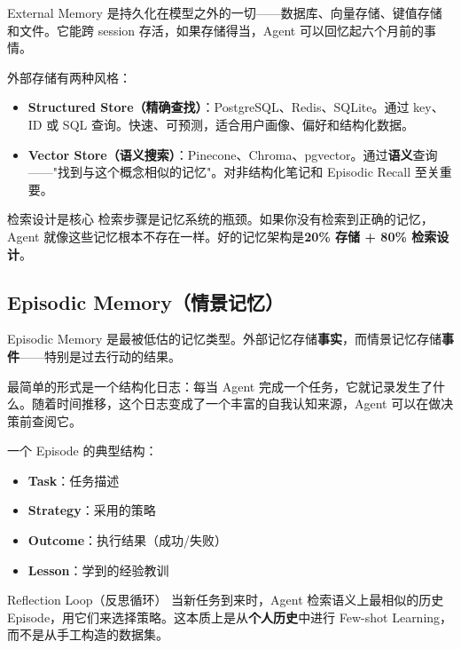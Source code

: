 External Memory 是持久化在模型之外的一切——数据库、向量存储、键值存储和文件。它能跨 session 存活，如果存储得当，Agent 可以回忆起六个月前的事情。

外部存储有两种风格：

\begin{itemize}[leftmargin=2em]
    \item \textbf{Structured Store（精确查找）}：PostgreSQL、Redis、SQLite。通过 key、ID 或 SQL 查询。快速、可预测，适合用户画像、偏好和结构化数据。
    \item \textbf{Vector Store（语义搜索）}：Pinecone、Chroma、pgvector。通过\textbf{语义}查询——"找到与这个概念相似的记忆"。对非结构化笔记和 Episodic Recall 至关重要。
\end{itemize}

\begin{importantbox}{检索设计是核心}
检索步骤是记忆系统的瓶颈。如果你没有检索到正确的记忆，Agent 就像这些记忆根本不存在一样。好的记忆架构是\textbf{20\% 存储 + 80\% 检索设计}。
\end{importantbox}

\subsection{Episodic Memory（情景记忆）}

Episodic Memory 是最被低估的记忆类型。外部记忆存储\textbf{事实}，而情景记忆存储\textbf{事件}——特别是过去行动的结果。

最简单的形式是一个结构化日志：每当 Agent 完成一个任务，它就记录发生了什么。随着时间推移，这个日志变成了一个丰富的自我认知来源，Agent 可以在做决策前查阅它。

一个 Episode 的典型结构：

\begin{itemize}[leftmargin=2em]
    \item \textbf{Task}：任务描述
    \item \textbf{Strategy}：采用的策略
    \item \textbf{Outcome}：执行结果（成功/失败）
    \item \textbf{Lesson}：学到的经验教训
\end{itemize}

\begin{knowledgebox}{Reflection Loop（反思循环）}
当新任务到来时，Agent 检索语义上最相似的历史 Episode，用它们来选择策略。这本质上是从\textbf{个人历史}中进行 Few-shot Learning，而不是从手工构造的数据集。
\end{knowledgebox}

